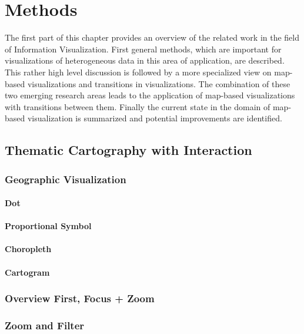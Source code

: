 \section{Methods}
The first part of this chapter provides an overview of the related work in the field of
Information Visualization. First general methods, which are important for visualizations of heterogeneous data in this area of application, are described. This rather high level discussion is followed by a more specialized view on map-based visualizations and transitions in visualizations. The combination of these two emerging research areas leads to the application of map-based visualizations with transitions between them. Finally the current state in the domain of map-based visualization is summarized and potential improvements are identified.

\subsection{Thematic Cartography with Interaction}

\subsubsection{Geographic Visualization}

\paragraph{Dot}

\paragraph{Proportional Symbol}

\paragraph{Choropleth}

\paragraph{Cartogram}

\subsubsection{Overview First, Focus + Zoom}

\subsubsection{Zoom and Filter}

